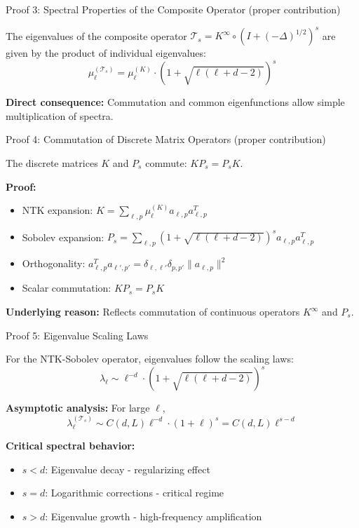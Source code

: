 \documentclass{beamer}
\begin{document}
\begin{frame}{Proof 3: Spectral Properties of the Composite Operator (proper contribution)}
\begin{theorem}
The eigenvalues of the composite operator $\mathcal{T}_s = K^{\infty} \circ (I + (-\Delta)^{1/2})^s$ are given by the product of individual eigenvalues:
\[ \mu_\ell^{(\mathcal{T}_s)} = \mu_\ell^{(K)} \cdot (1 + \sqrt{\ell(\ell + d - 2)})^s \]
\end{theorem}

\textbf{Direct consequence:} Commutation and common eigenfunctions allow simple multiplication of spectra.
\end{frame}

\begin{frame}{Proof 4: Commutation of Discrete Matrix Operators (proper contribution)}
\begin{theorem}
The discrete matrices $K$ and $P_s$ commute: $KP_s = P_sK$.
\end{theorem}

\textbf{Proof:}
\begin{itemize}
\item NTK expansion: $K = \sum_{\ell,p} \mu_\ell^{(K)} a_{\ell,p} a_{\ell,p}^T$
\item Sobolev expansion: $P_s = \sum_{\ell,p} (1 + \sqrt{\ell(\ell + d - 2)})^s a_{\ell,p} a_{\ell,p}^T$
\item Orthogonality: $a_{\ell,p}^T a_{\ell',p'} = \delta_{\ell,\ell'} \delta_{p,p'} \|a_{\ell,p}\|^2$
\item Scalar commutation: $KP_s = P_sK$
\end{itemize}

\textbf{Underlying reason:} Reflects commutation of continuous operators $K^{\infty}$ and $P_s$.
\end{frame}

\begin{frame}{Proof 5: Eigenvalue Scaling Laws}
\begin{theorem}
For the NTK-Sobolev operator, eigenvalues follow the scaling laws:
\[ \lambda_\ell \sim \ell^{-d} \cdot (1 + \sqrt{\ell(\ell + d - 2)})^s \]
\end{theorem}

\textbf{Asymptotic analysis:} For large $\ell$,
\[ \lambda_\ell^{(\mathcal{T}_s)} \sim C(d, L) \ell^{-d} \cdot (1 + \ell)^s = C(d, L) \ell^{s-d} \]

\textbf{Critical spectral behavior:}
\begin{itemize}
\item $s < d$: Eigenvalue decay - regularizing effect
\item $s = d$: Logarithmic corrections - critical regime
\item $s > d$: Eigenvalue growth - high-frequency amplification
\end{itemize}
\end{frame}
\end{document}
